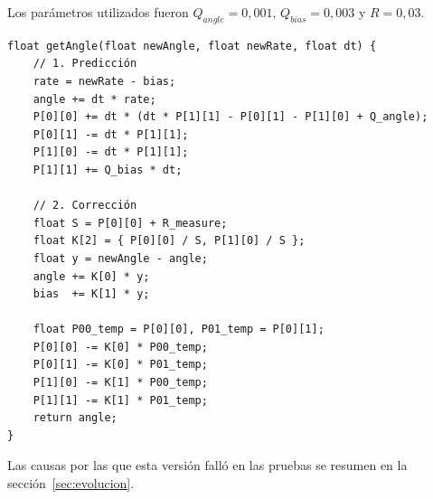 Los parámetros utilizados fueron $Q_{angle} = 0{,}001$, $Q_{bias} = 0{,}003$ y $R = 0{,}03$.

\begin{lstlisting}[caption={Etapas del filtro de Kalman (\texttt{KalmanFilter.h}, versión 1.0.0).}, label={cod:kalman}]
float getAngle(float newAngle, float newRate, float dt) {
    // 1. Predicción
    rate = newRate - bias;
    angle += dt * rate;
    P[0][0] += dt * (dt * P[1][1] - P[0][1] - P[1][0] + Q_angle);
    P[0][1] -= dt * P[1][1];
    P[1][0] -= dt * P[1][1];
    P[1][1] += Q_bias * dt;

    // 2. Corrección
    float S = P[0][0] + R_measure;
    float K[2] = { P[0][0] / S, P[1][0] / S };
    float y = newAngle - angle;
    angle += K[0] * y;
    bias  += K[1] * y;

    float P00_temp = P[0][0], P01_temp = P[0][1];
    P[0][0] -= K[0] * P00_temp;
    P[0][1] -= K[0] * P01_temp;
    P[1][0] -= K[1] * P00_temp;
    P[1][1] -= K[1] * P01_temp;
    return angle;
}
\end{lstlisting}

Las causas por las que esta versión falló en las pruebas se resumen en la sección~\ref{sec:evolucion}.
